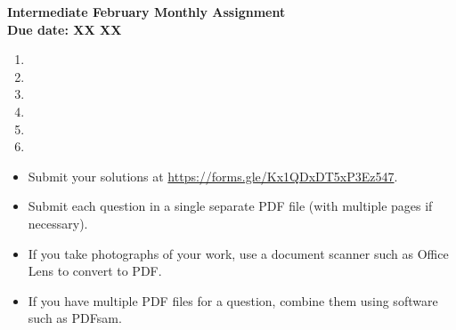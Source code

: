\documentclass{article}
\begin{document}
\thispagestyle{empty}

\begin{center}
  \textbf{\Large Intermediate February Monthly Assignment}
  \\ \vspace{1em}
  \textbf{\large Due date: XX XX}
\end{center}

\vspace{12pt}

\begin{enumerate}[1.]

\item %


\item %


\item %


\item %


\item %


\item %


\end{enumerate}


\vfill
\begin{itemize}
	\item Submit your solutions at \url{https://forms.gle/Kx1QDxDT5xP3Ez547}.
	\item Submit each question in a single separate PDF file (with multiple pages if necessary).
	\item If you take photographs of your work, use a document scanner such as Office Lens to convert to PDF.
	\item If you have multiple PDF files for a question, combine them using software such as PDFsam.
\end{itemize}

\vfill
\centering
\tiny
\begin{BVerbatim}
\end{BVerbatim}
\end{document}
